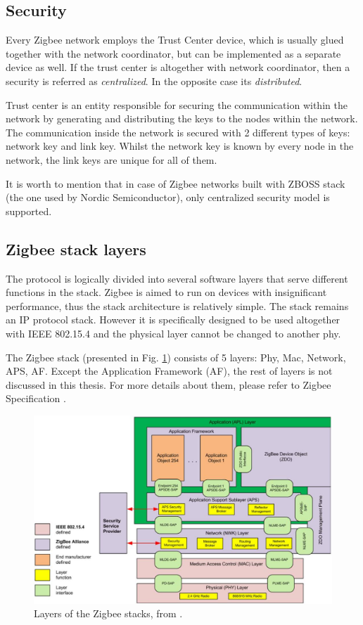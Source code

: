 \subsection{Security}
\label{subsec:zigbee_security}
Every Zigbee network employs the Trust 
Center device, which is usually glued together with the network coordinator, 
but can be implemented as a separate device as well. If the trust center is altogether with network 
coordinator, then a security is referred as \textit{centralized}. In the opposite case its \textit{distributed}\cite{ZigbeeSecurity}.

Trust center is an entity responsible for securing the communication within the network by
generating and distributing the keys to the nodes within the network. The communication inside the network
is secured with 2 different types of keys: network key and link key. Whilst the network key is known by every 
node in the network, the link keys are unique for all of them\cite{ZigbeeSecurity}.

It is worth to mention that in  case of Zigbee networks built with ZBOSS stack (the one used by Nordic Semiconductor), only centralized security model is supported.

\subsection{Zigbee stack layers}

The protocol is logically divided into several software layers that serve
different functions in the stack. Zigbee is aimed to run on devices with
insignificant performance, thus the stack architecture is relatively simple. The stack 
remains an IP protocol stack. However it is specifically designed to be used
altogether with IEEE 802.15.4 and the physical layer cannot be changed to another 
phy.

The Zigbee stack (presented in Fig. \ref{fig:zigbee_stack}) consists of 5 layers:
Phy, Mac, Network, APS, AF. Except the Application Framework (AF), the rest of layers is not
discussed in this thesis. For more details about them, please refer to Zigbee Specification \cite{ZigbeeSpecification}.

\begin{figure}[H]
    \centering
    \includegraphics[scale=0.4]{images/zigbee-stack.jpg}
    \caption{Layers of the Zigbee stacks, from \cite{ZigbeeSpecification}.}
    \label{fig:zigbee_stack}
\end{figure}

